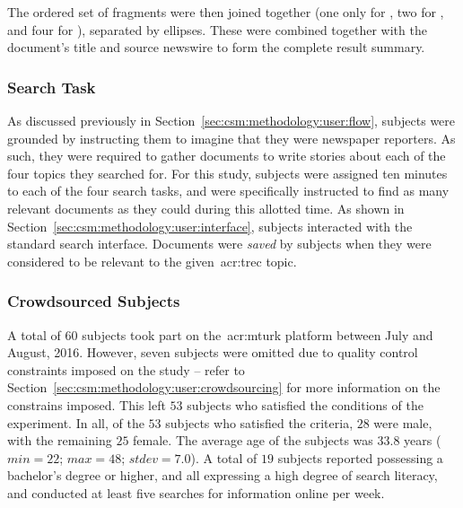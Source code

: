 \begin{figure}[h]
    \centering
    \vspace{4mm}
    \label{fig:fragment_example}
    \vspace{-5mm}
\end{figure}

The ordered set of fragments were then joined together (one only for , two for , and four for ), separated by ellipses. These were combined together with the document's title and source newswire to form the complete result summary.

\subsubsection{Search Task}
As discussed previously in Section~\ref{sec:csm:methodology:user:flow}, subjects were grounded by instructing them to imagine that they were newspaper reporters. As such, they were required to gather documents to write stories about each of the four topics they searched for. For this study, subjects were assigned ten minutes to each of the four search tasks, and were specifically instructed to find as many relevant documents as they could during this allotted time. As shown in Section~\ref{sec:csm:methodology:user:interface}, subjects interacted with the standard search interface. Documents were \emph{saved} by subjects when they were considered to be relevant to the given~\gls{acr:trec} topic.

\subsubsection{Crowdsourced Subjects}
A total of $60$ subjects took part on the~\gls{acr:mturk} platform between July and August, 2016. However, seven subjects were omitted due to quality control constraints imposed on the study -- refer to Section~\ref{sec:csm:methodology:user:crowdsourcing} for more information on the constrains imposed. This left $53$ subjects who satisfied the conditions of the experiment. In all, of the $53$ subjects who satisfied the criteria, $28$ were male, with the remaining $25$ female. The average age of the subjects was $33.8$ years ($min=22$; $max=48$; $stdev=7.0$). A total of $19$ subjects reported possessing a bachelor's degree or higher, and all expressing a high degree of search literacy, and conducted at least five searches for information online per week.

